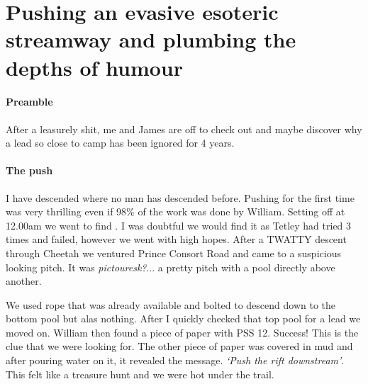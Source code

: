 

\section{Pushing an evasive esoteric streamway and plumbing the depths of humour}


\paragraph{Preamble}
After a leasurely shit, me and James are off to check out  and maybe discover why a lead so close to camp has been ignored for 4 years.
\paragraph{The push} I have descended where no man has descended before. Pushing for the first time was very thrilling even if 98$\%$ of the work was done by William. 
Setting off at 12.00am we went to find . I was doubtful we would find it as Tetley had tried 3 times and failed, however we went with high hopes.
After a TWATTY descent through Cheetah we ventured Prince Consort Road and came to a suspicious looking pitch. It was \textit{pictouresk?}...  a pretty pitch with a pool directly above another.

We used rope that was already available and bolted to descend down to the bottom pool but alas nothing. After I quickly checked that top pool for a lead we moved on. William then found a piece of paper with PSS 12. Success! This is the clue that we were looking for. The other piece of paper was covered in mud and after pouring water on it, it revealed the message.  \textit{`Push the rift downstream'}. This felt like a treasure hunt and we were hot under the trail.

